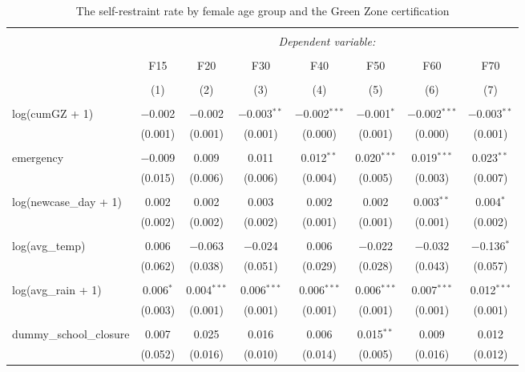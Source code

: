 
\begin{table}[!htbp] \centering 
  \caption{The self-restraint rate by female age group and the Green Zone certification} 
  \label{} 
\begin{tabular}{@{\extracolsep{-15pt}}lccccccc} 
\\[-1.8ex]\hline 
\hline \\[-1.8ex] 
 & \multicolumn{7}{c}{\textit{Dependent variable:}} \\ 
\cline{2-8} 
\\[-1.8ex] & F15 & F20 & F30 & F40 & F50 & F60 & F70 \\ 
\\[-1.8ex] & (1) & (2) & (3) & (4) & (5) & (6) & (7)\\ 
\hline \\[-1.8ex] 
 log(cumGZ + 1) & $-$0.002 & $-$0.002 & $-$0.003$^{**}$ & $-$0.002$^{***}$ & $-$0.001$^{*}$ & $-$0.002$^{***}$ & $-$0.003$^{**}$ \\ 
  & (0.001) & (0.001) & (0.001) & (0.000) & (0.001) & (0.000) & (0.001) \\ 
  & & & & & & & \\ 
 emergency & $-$0.009 & 0.009 & 0.011 & 0.012$^{**}$ & 0.020$^{***}$ & 0.019$^{***}$ & 0.023$^{**}$ \\ 
  & (0.015) & (0.006) & (0.006) & (0.004) & (0.005) & (0.003) & (0.007) \\ 
  & & & & & & & \\ 
 log(newcase\_day + 1) & 0.002 & 0.002 & 0.003 & 0.002 & 0.002 & 0.003$^{**}$ & 0.004$^{*}$ \\ 
  & (0.002) & (0.002) & (0.002) & (0.001) & (0.001) & (0.001) & (0.002) \\ 
  & & & & & & & \\ 
 log(avg\_temp) & 0.006 & $-$0.063 & $-$0.024 & 0.006 & $-$0.022 & $-$0.032 & $-$0.136$^{*}$ \\ 
  & (0.062) & (0.038) & (0.051) & (0.029) & (0.028) & (0.043) & (0.057) \\ 
  & & & & & & & \\ 
 log(avg\_rain + 1) & 0.006$^{*}$ & 0.004$^{***}$ & 0.006$^{***}$ & 0.006$^{***}$ & 0.006$^{***}$ & 0.007$^{***}$ & 0.012$^{***}$ \\ 
  & (0.003) & (0.001) & (0.001) & (0.001) & (0.001) & (0.001) & (0.001) \\ 
  & & & & & & & \\ 
 dummy\_school\_closure & 0.007 & 0.025 & 0.016 & 0.006 & 0.015$^{**}$ & 0.009 & 0.012 \\ 
  & (0.052) & (0.016) & (0.010) & (0.014) & (0.005) & (0.016) & (0.012) \\ 

\end{tabular}
\end{table}
